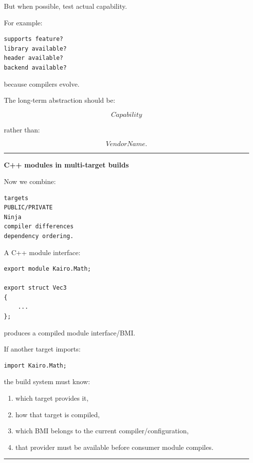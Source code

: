 But when possible, test actual capability.

For example:

\begin{verbatim}
supports feature?
library available?
header available?
backend available?
\end{verbatim}

because compilers evolve.

The long-term abstraction should be:

\[
Capability
\]

rather than:

\[
VendorName.
\]

\begin{center}\rule{0.5\linewidth}{0.5pt}\end{center}

\textbf{C++ modules in multi-target builds}

Now we combine:

\begin{verbatim}
targets
PUBLIC/PRIVATE
Ninja
compiler differences
dependency ordering.
\end{verbatim}

A C++ module interface:

\begin{verbatim}
export module Kairo.Math;

export struct Vec3
{
    ...
};
\end{verbatim}

produces a compiled module interface/BMI.

If another target imports:

\begin{verbatim}
import Kairo.Math;
\end{verbatim}

the build system must know:

\begin{enumerate}
\def\labelenumi{\arabic{enumi}.}
\tightlist
\item
  which target provides it,
\item
  how that target is compiled,
\item
  which BMI belongs to the current compiler/configuration,
\item
  that provider must be available before consumer module compiles.
\end{enumerate}

\begin{center}\rule{0.5\linewidth}{0.5pt}\end{center}

